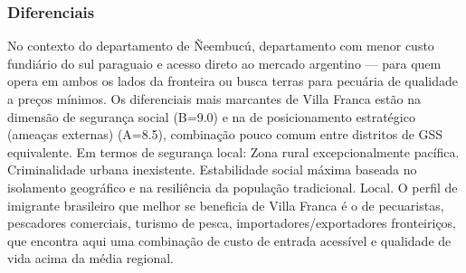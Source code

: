 \subsubsection*{Diferenciais}\label{dif-villa-franca-1214}
No contexto do departamento de Ñeembucú, departamento com menor custo fundiário do sul paraguaio e acesso direto ao mercado argentino — para quem opera em ambos os lados da fronteira ou busca terras para pecuária de qualidade a preços mínimos. Os diferenciais mais marcantes de Villa Franca estão na dimensão de segurança social (B=9.0) e na de posicionamento estratégico (ameaças externas) (A=8.5), combinação pouco comum entre distritos de GSS equivalente. Em termos de segurança local: Zona rural excepcionalmente pacífica. Criminalidade urbana inexistente. Estabilidade social máxima baseada no isolamento geográfico e na resiliência da população tradicional. Local. O perfil de imigrante brasileiro que melhor se beneficia de Villa Franca é o de pecuaristas, pescadores comerciais, turismo de pesca, importadores/exportadores fronteiriços, que encontra aqui uma combinação de custo de entrada acessível e qualidade de vida acima da média regional.

